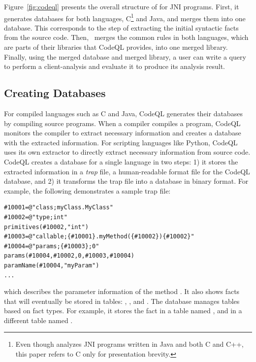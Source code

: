 Figure~\ref{fig:codeql} presents the overall structure of \ours for JNI
programs.  First, it generates databases for both languages, C\footnote{ Even
though \ours analyzes JNI programs written in Java and both C and C++, this
paper refers to C only for presentation brevity.} and Java, and merges them
into one database.  This corresponds to the step of extracting the initial
syntactic facts from the source code.  Then, \ours~merges the common rules in
both languages, which are parts of their libraries that CodeQL provides, into
one merged library.  Finally, using the merged database and merged library, a
user can write a query to perform a client-analysis and evaluate it to produce
its analysis result.

\subsection{Creating Databases}
For compiled languages such as C and Java, CodeQL generates their databases by
compiling source programs.  When a compiler compiles a program, CodeQL monitors
the compiler to extract necessary information and creates a database with the
extracted information. For scripting languages like Python, CodeQL uses its own
extractor to directly extract necessary information from source code.  CodeQL
creates a database for a single language in two steps: 1) it stores the
extracted information in a  \textit{trap} file, a human-readable format file for
the CodeQL database, and 2) it transforms the trap file into a database in
binary format.  For example, the following demonstrates a sample trap file:

\begin{lstlisting}[style=java,numbers=none]
#10001=@"class;myClass.MyClass"
#10002=@"type;int"
primitives(#10002,"int")
#10003=@"callable;{#10001}.myMethod({#10002}){#10002}"
#10004=@"params;{#10003};0"
params(#10004,#10002,0,#10003,#10004)
paramName(#10004,"myParam")
...
\end{lstlisting}

\noindent
which describes the parameter information of the method .
It also shows facts that will eventually be stored in tables:
, , and
.  The database manages tables based on fact types.
For example, it stores the fact  in a table named
, and  in a different table named
.

